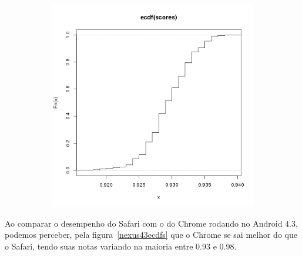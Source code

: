 \documentclass[11pt,a4paper]{article}
\begin{document}
\begin{figure}[H]
\begin{subfigure}{.5\textwidth}
        \includegraphics[width=\textwidth]{images/ecdf-ipad-3-ios7-safari-200-amostras-20131126}
        \label{safari200}
    \end{subfigure}
\end{figure}

Ao comparar o desempenho do Safari com o do Chrome rodando no Android 4.3, podemos perceber, pela
figura~\ref{nexus43ecdfs} que o Chrome se sai melhor do que o Safari, tendo suas notas variando na maioria entre 0.93 e
0.98.
\end{document}
